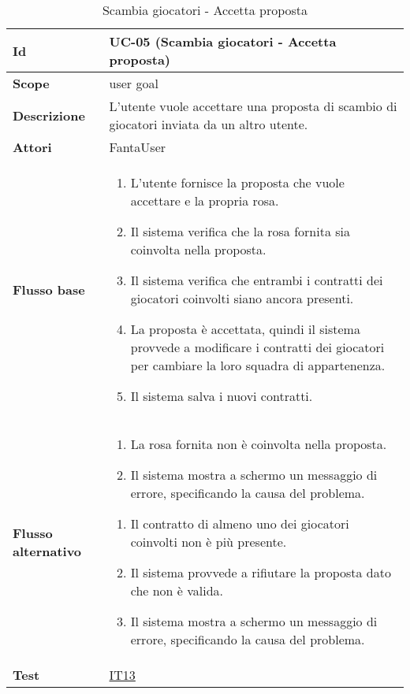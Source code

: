 \begin{table}[H]
\caption{Scambia giocatori - Accetta proposta}
\label{UC-05}

\begin{tabularx}{\textwidth}{|l|X|}
\hline
\textbf{Id} & UC-05 (Scambia giocatori - Accetta proposta) \\
\hline
\textbf{Scope} & user goal \\
\hline
\textbf{Descrizione} & L'utente vuole accettare una proposta di scambio di giocatori inviata da un altro utente. \\
\hline
\textbf{Attori} & FantaUser \\
\hline
\textbf{Flusso base} &
\begin{enumerate}[leftmargin=*]
    \item L'utente fornisce la proposta che vuole accettare e la propria rosa.
    \item Il sistema verifica che la rosa fornita sia coinvolta nella proposta.
    \item Il sistema verifica che entrambi i contratti dei giocatori coinvolti siano ancora presenti.
    \item La proposta è accettata, quindi il sistema provvede a modificare i contratti dei giocatori
            per cambiare la loro squadra di appartenenza.
    \item Il sistema salva i nuovi contratti. 
\end{enumerate} \\
\hline
\textbf{Flusso alternativo} &
\begin{enumerate}[leftmargin=*,label=2.\arabic*]
    \item La rosa fornita non è coinvolta nella proposta.
    \item Il sistema mostra a schermo un messaggio di errore, specificando la causa del problema.
\end{enumerate}
\begin{enumerate}[leftmargin=*,label=3.\arabic*]
    \item Il contratto di almeno uno dei giocatori coinvolti non è più presente.
    \item Il sistema provvede a rifiutare la proposta dato che non è valida.
    \item Il sistema mostra a schermo un messaggio di errore, specificando la causa del problema.
\end{enumerate} \\
\hline
\textbf{Test} & \hyperref[IT13]{IT13} \\
\hline
\end{tabularx}

\end{table}